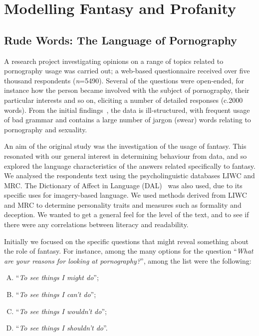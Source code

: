 \documentclass{AISB2008}
\begin{document}
\section{Modelling Fantasy and Profanity}

\subsection{Rude Words: The Language of Pornography}

A research project investigating opinions on a range of topics related
to pornography usage was carried out; a web-based questionnaire
received over five thousand respondents ({\emph{n}}=5490). Several of
the questions were open-ended, for instance how the person became
involved with the subject of pornography, their particular interests
and so on, eliciting a number of detailed responses (c.2000
words). From the initial findings~\cite{smith-et-al:2013}, the data is
ill-structured, with frequent usage of bad grammar and contains a
large number of jargon (swear) words relating to pornography and
sexuality.

An aim of the original study was the investigation of the usage of
fantasy. This resonated with our general interest in determining
behaviour from data, and so explored the language characteristics of
the answers related specifically to fantasy. We analysed the
respondents text using the psycholinguistic databases LIWC and
MRC. The Dictionary of Affect in Language
(DAL)~\cite{sweeney+whissell:1984} was also used, due to its specific
uses for imagery-based language. We used methods derived from LIWC and
MRC to determine personality traits and measures such as formality and
deception. We wanted to get a general feel for the level of the text,
and to see if there were any correlations between literacy and
readability.

Initially we focused on the specific questions that might reveal
something about the role of fantasy. For instance, among the many
options for the question ``{\emph{What are your reasons for looking at
pornography?}}'', among the list were the following:

\begin{enumerate}[(A)]
\item ``{\emph{To see things I might do}}'';
\item ``{\emph{To see things I can't do}}'';
\item ``{\emph{To see things I wouldn't do}}'';
\item ``{\emph{To see things I shouldn't do}}''.
\end{enumerate}
\end{document}
